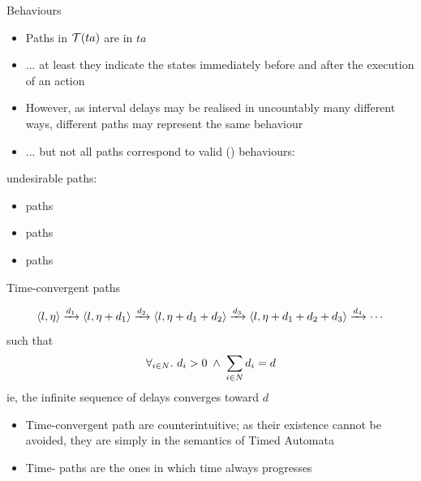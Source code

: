 \documentclass[aspectratio=169]{beamer}
\begin{document}
\begin{slide}{Behaviours}
\small

\begin{itemize}
\item Paths in $\mathcal{T}(ta)$ are  in $ta$
\item ... at least they indicate the states immediately before and after the execution of an action
\item However, as interval delays may be realised in \alert{uncountably} many different ways, different paths 
may represent the same behaviour
\pause
\item ... but not all paths correspond to valid  () behaviours:
\end{itemize}

\begin{block}{undesirable paths:}
\begin{itemize}
\item  {} paths
\item  {} paths
\item  {} paths
\end{itemize}
\end{block}
\end{slide}

\begin{slide}{Time-convergent paths}
\small

\begin{equation*}
\langle l,\eta \rangle  \xrightarrow{d_1} \langle l,\eta + d_1 \rangle  \xrightarrow{d_2} \langle l,\eta + d_1 + d_2 \rangle  \xrightarrow{d_3} \langle l,\eta + d_1 + d_2 + d_3 \rangle  \xrightarrow{d_4} 
\cdots  
\end{equation*}
such that 
\begin{equation*}
\forall_{i \in N}\mathbf{.}\,\, d_i > 0\; \land\; \sum_{i \in N}  d_i = d
\end{equation*}
ie, the \alert{infinite sequence of delays converges toward $d$}

\begin{itemize}
\item Time-convergent path are \alert{counterintuitive}; as their existence cannot be avoided, they are simply   in the semantics of Timed Automata
\item Time- paths are the ones in which time always progresses
\end{itemize}
\end{slide}
\end{document}
